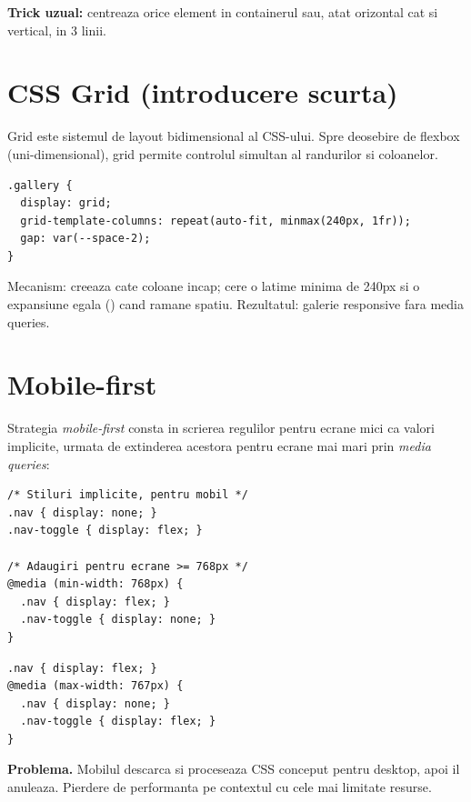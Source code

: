 \begin{ponturi}
\textbf{Trick uzual:}  centreaza orice element in containerul sau, atat orizontal cat si vertical, in 3 linii.
\end{ponturi}

\section{CSS Grid (introducere scurta)}

Grid este sistemul de layout bidimensional al CSS-ului. Spre deosebire de flexbox (uni-dimensional), grid permite controlul simultan al randurilor si coloanelor.

\begin{lstlisting}[style=css, caption={Galerie cu coloane responsive automat}]
.gallery {
  display: grid;
  grid-template-columns: repeat(auto-fit, minmax(240px, 1fr));
  gap: var(--space-2);
}
\end{lstlisting}

Mecanism:  creeaza cate coloane incap;  cere o latime minima de 240px si o expansiune egala () cand ramane spatiu. Rezultatul: galerie responsive fara media queries.

\section{Mobile-first}

Strategia \emph{mobile-first} consta in scrierea regulilor pentru ecrane mici ca valori implicite, urmata de extinderea acestora pentru ecrane mai mari prin \emph{media queries}:

\begin{lstlisting}[style=css]
/* Stiluri implicite, pentru mobil */
.nav { display: none; }
.nav-toggle { display: flex; }

/* Adaugiri pentru ecrane >= 768px */
@media (min-width: 768px) {
  .nav { display: flex; }
  .nav-toggle { display: none; }
}
\end{lstlisting}

\begin{dano}
\begin{lstlisting}[style=css, numbers=none]
.nav { display: flex; }
@media (max-width: 767px) {
  .nav { display: none; }
  .nav-toggle { display: flex; }
}
\end{lstlisting}
\textbf{Problema.} Mobilul descarca si proceseaza CSS conceput pentru desktop, apoi il anuleaza. Pierdere de performanta pe contextul cu cele mai limitate resurse.
\end{dano}

